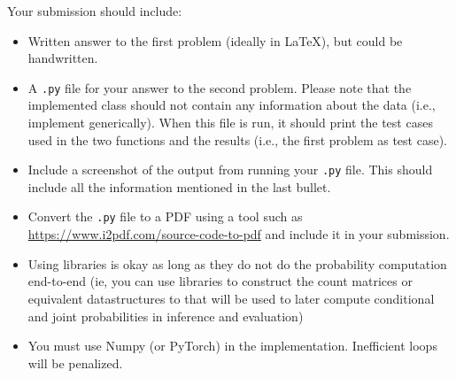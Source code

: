 \documentclass{article}
\begin{document}
\begin{tcolorbox}[colframe=orange!50!black, colback=orange!10, coltitle=black]
Your submission should include:
\begin{itemize}
    \item Written answer to the first problem (ideally in LaTeX), but could be handwritten.
    \item A \texttt{.py} file for your answer to the second problem. Please note that the implemented class should not contain any information about the data (i.e., implement generically). When this file is run, it should print the test cases used in the two functions and the results (i.e., the first problem as test case).
    \item Include a screenshot of the output from running your \texttt{.py} file. This should include all the information mentioned in the last bullet.
    \item Convert the \texttt{.py} file to a PDF using a tool such as \url{https://www.i2pdf.com/source-code-to-pdf} and include it in your submission.
    \item Using libraries is okay as long as they do not do the probability computation end-to-end (ie, you can use libraries to construct the count matrices or equivalent datastructures to that will be used to later compute conditional and joint probabilities in inference and evaluation)
    \item You must use Numpy (or PyTorch) in the implementation. Inefficient loops will be penalized.
\end{itemize}
\end{tcolorbox}
\end{document}
